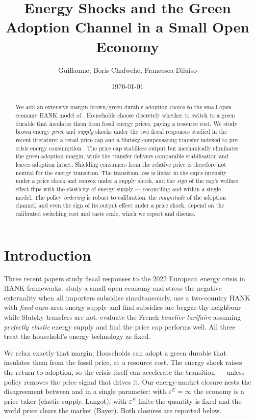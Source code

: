 \documentclass[11pt,a4paper]{article}
\title{\textbf{Energy Shocks and the Green Adoption Channel in a Small Open Economy}}
\author{Guillaume, Boris Chafwehe, Francesca Diluiso}
\date{\today}
\begin{document}
\maketitle

\begin{abstract}
\noindent We add an extensive-margin brown/green durable adoption choice to the
small open economy HANK model of \citet{ARS2024}. Households choose discretely
whether to switch to a green durable that insulates them from fossil energy
prices, paying a resource cost. We study brown energy \emph{price} and
\emph{supply} shocks under the two fiscal responses studied in the recent
literature: a retail price cap \citep{Langot2026} and a Slutsky-compensating
transfer indexed to pre-crisis energy consumption \citep{Bayer2026}. The price
cap stabilises output but mechanically eliminates the green adoption margin,
while the transfer delivers comparable stabilisation and leaves adoption
intact. Shielding consumers from the relative price is therefore not neutral
for the energy transition. The transition loss is linear in the cap's
intensity under a price shock and convex under a supply shock, and the
\emph{sign} of the cap's welfare effect flips with the elasticity of energy
supply --- reconciling \citet{Langot2026} and \citet{Bayer2026} within a
single model. The policy \emph{ordering} is robust to calibration; the
\emph{magnitude} of the adoption channel, and even the sign of its output
effect under a price shock, depend on the calibrated switching cost and taste
scale, which we report and discuss.
\end{abstract}

\section{Introduction}

Three recent papers study fiscal responses to the 2022 European energy crisis
in HANK frameworks. \citet{ARS2024} study a small open economy and stress the
negative externality when all importers subsidise simultaneously.
\citet{Bayer2026} use a two-country HANK with \emph{fixed} euro-area energy
supply and find subsidies are beggar-thy-neighbour while Slutsky transfers are
not. \citet{Langot2026} evaluate the French \emph{bouclier tarifaire} assuming
\emph{perfectly elastic} energy supply and find the price cap performs well.
All three treat the household's energy technology as fixed.

We relax exactly that margin. Households can adopt a green durable that
insulates them from the fossil price, at a resource cost. The energy shock
raises the return to adoption, so the crisis itself can accelerate the
transition --- unless policy removes the price signal that drives it. Our
energy-market closure nests the disagreement between \citet{Bayer2026} and
\citet{Langot2026} in a single parameter: with $\varepsilon^{E}=\infty$ the
economy is a price taker (elastic supply, Langot); with $\varepsilon^{E}$
finite the quantity is fixed and the world price clears the market (Bayer).
Both closures are reported below.
\end{document}
